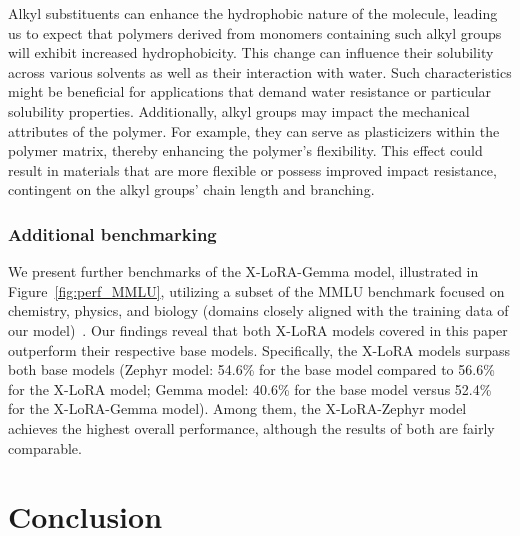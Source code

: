 Alkyl substituents can enhance the hydrophobic nature of the molecule, leading us to expect that polymers derived from monomers containing such alkyl groups will exhibit increased hydrophobicity. This change can influence their solubility across various solvents as well as their interaction with water. Such characteristics might be beneficial for applications that demand water resistance or particular solubility properties. Additionally, alkyl groups may impact the mechanical attributes of the polymer. For example, they can serve as plasticizers within the polymer matrix, thereby enhancing the polymer's flexibility. This effect could result in materials that are more flexible or possess improved impact resistance, contingent on the alkyl groups’ chain length and branching.

\subsubsection{Additional benchmarking} We present further benchmarks of the X-LoRA-Gemma model, illustrated in Figure~\ref{fig:perf_MMLU}, utilizing a subset of the MMLU benchmark focused on chemistry, physics, and biology (domains closely aligned with the training data of our model)~\cite{Hendrycks2020MeasuringUnderstanding}. Our findings reveal that both X-LoRA models covered in this paper outperform their respective base models. Specifically, the X-LoRA models surpass both base models (Zephyr model: 54.6\% for the base model compared to 56.6\% for the X-LoRA model; Gemma model: 40.6\% for the base model versus 52.4\% for the X-LoRA-Gemma model). Among them, the X-LoRA-Zephyr model achieves the highest overall performance, although the results of both are fairly comparable.

\section{Conclusion}

